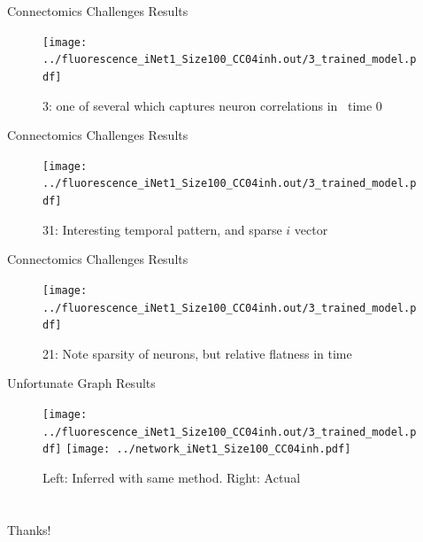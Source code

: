 \documentclass[xcolor=svgnames]{beamer}
\begin{document}
\begin{frame}{Connectomics Challenges Results}\begin{figure}[h]
	\centering
	\texttt{[image: ../fluorescence\_iNet1\_Size100\_CC04inh.out/3\_trained\_model.pdf]}
	\caption{3: one of several which captures neuron correlations in ~time 0}
	\end{figure}
\end{frame}


\begin{frame}{Connectomics Challenges Results}
\begin{figure}[h]
	\centering
	\texttt{[image: ../fluorescence\_iNet1\_Size100\_CC04inh.out/3\_trained\_model.pdf]}
	\caption{31: Interesting temporal pattern, and sparse $i$ vector}
	\end{figure}
\end{frame}

\begin{frame}{Connectomics Challenges Results}
\begin{figure}[h]
	\centering
	\texttt{[image: ../fluorescence\_iNet1\_Size100\_CC04inh.out/3\_trained\_model.pdf]}
	\caption{21: Note sparsity  of neurons, but relative flatness in time}
	\end{figure}
\end{frame}

\begin{frame}{Unfortunate Graph Results}
\begin{figure}[h]
	\centering
	\texttt{[image: ../fluorescence\_iNet1\_Size100\_CC04inh.out/3\_trained\_model.pdf]}
	\hfill
	\texttt{[image: ../network\_iNet1\_Size100\_CC04inh.pdf]}
	\caption{Left: Inferred with same method. Right: Actual}
\end{figure}
\end{frame}

\section{}
\begin{frame}
	  \centering \Huge
  Thanks!
\end{frame}
\end{document}
